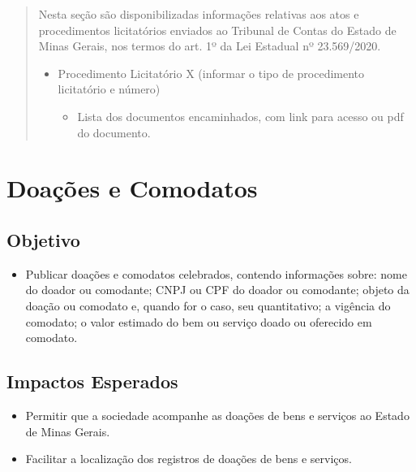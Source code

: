 \documentclass[
]{book}
\providecommand{\tightlist}{%
  \setlength{\itemsep}{0pt}\setlength{\parskip}{0pt}}
\begin{document}
\begin{quote}
Nesta seção são disponibilizadas informações relativas aos atos e procedimentos licitatórios enviados ao Tribunal de Contas do Estado de Minas Gerais, nos termos do art. 1º da Lei Estadual nº 23.569/2020.

\begin{itemize}
\tightlist
\item
  Procedimento Licitatório X (informar o tipo de procedimento licitatório e número)

  \begin{itemize}
  \tightlist
  \item
    Lista dos documentos encaminhados, com link para acesso ou pdf do documento.
  \end{itemize}
\end{itemize}
\end{quote}

\hypertarget{doauxe7uxf5es-e-comodatos}{%
\section{Doações e Comodatos}\label{doauxe7uxf5es-e-comodatos}}

\hypertarget{objetivo-11}{%
\subsection{Objetivo}\label{objetivo-11}}

\begin{itemize}
\tightlist
\item
  Publicar doações e comodatos celebrados, contendo informações sobre: nome do doador ou comodante; CNPJ ou CPF do doador ou comodante; objeto da doação ou comodato e, quando for o caso, seu quantitativo; a vigência do comodato; o valor estimado do bem ou serviço doado ou oferecido em comodato.
\end{itemize}

\hypertarget{impactos-esperados-12}{%
\subsection{Impactos Esperados}\label{impactos-esperados-12}}

\begin{itemize}
\tightlist
\item
  Permitir que a sociedade acompanhe as doações de bens e serviços ao Estado de Minas Gerais.
\item
  Facilitar a localização dos registros de doações de bens e serviços.
\end{itemize}
\end{document}
